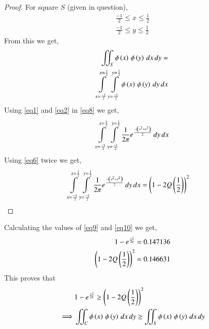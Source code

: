 \documentclass[journal,12pt,twocolumn]{IEEEtran}
\begin{document}
\begin{proof}
For square $S$ (given in question),
\begin{align}
    \frac{-1}{2}\leq x \leq \frac{1}{2}\\
    \frac{-1}{2}\leq y \leq \frac{1}{2}
\end{align}
From this we get,
\begin{align}
    \iint_S{\phi\left(x\right)\,\phi\left(y\right)\,dx\,dy} = \nonumber\\
    \int\limits_{x=\frac{-1}{2}}^{x=\frac{1}{2}} \int\limits_{y=\frac{-1}{2}}^{y=\frac{1}{2}} \phi\left(x\right)\,\phi\left(y\right)\,dy\,dx \label{eq8}
\end{align}
Using \eqref{eq1} and \eqref{eq2} in \eqref{eq8} we get,
\begin{align}
    \int\limits_{x=\frac{-1}{2}}^{x=\frac{1}{2}} \int\limits_{y=\frac{-1}{2}}^{y=\frac{1}{2}}\frac{1}{2\pi}e^\frac{-\left(x^2+y^2\right)}{2}\,dy\,dx
\end{align}
Using \eqref{eq6} twice we get,
\begin{align}
    \int\limits_{x=\frac{-1}{2}}^{x=\frac{1}{2}} \int\limits_{y=\frac{-1}{2}}^{y=\frac{1}{2}}\frac{1}{2\pi}e^\frac{-\left(x^2+y^2\right)}{2}\,dy\,dx &= \left(1-2Q\left(\frac{1}{2}\right)\right)^2
\end{align}
\end{proof}
\begin{solution}
Calculating the values of \eqref{eq9} and \eqref{eq10} we get,
\begin{align}
    1 - e^{\frac{-1}{2\pi}} &= 0.147136\\
    \left(1-2Q\left(\frac{1}{2}\right)\right)^2 &= 0.146631
\end{align}
This proves that 
\begin{align}
    &1 - e^{\frac{-1}{2\pi}} \geq \left(1-2Q\left(\frac{1}{2}\right)\right)^2\\
    \implies  &\iint_C{\phi\left(x\right)\,\phi\left(y\right)\,dx\,dy} \geq \iint_S{\phi\left(x\right)\,\phi\left(y\right)\,dx\,dy}
\end{align}
\end{solution}
\end{document}
